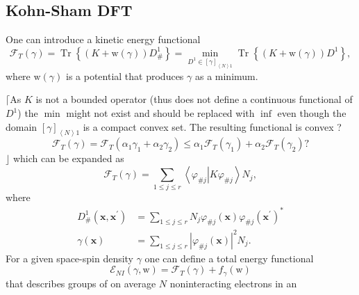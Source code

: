 \documentclass[aps,preprint]{revtex4}%
\begin{document}
\subsection{Kohn-Sham DFT}

\bigskip One can introduce a kinetic energy functional
\begin{equation}
\mathcal{F}_{T}\left(  \gamma\right)  =\operatorname{Tr}\left\{  \left(
K+\mathrm{w}\left(  \gamma\right)  \right)  D_{\#}^{1}\right\}  =\min
_{D^{1}\in\left[  \gamma\right]  _{\left\langle N\right\rangle 1}%
}\operatorname{Tr}\left\{  \left(  K+\mathrm{w}\left(  \gamma\right)  \right)
D^{1}\right\}  , \label{KEFunc}%
\end{equation}
where $\mathrm{w}\left(  \gamma\right)  $ is a potential that produces
$\gamma$ as a minimum.

$\lceil$As $K$ is not a bounded operator (thus does not define a continuous
functional of $D^{1}$) the $\min$ might not exist and should be replaced with
$\inf$ even though the domain $\left[  \gamma\right]  _{\left\langle
N\right\rangle 1}$ is a compact convex set. The resulting functional is convex
?
\begin{equation}
\mathcal{F}_{T}\left(  \gamma\right)  =\mathcal{F}_{T}\left(  \alpha_{1}%
\gamma_{1}+\alpha_{2}\gamma_{2}\right)  \leq\alpha_{1}\mathcal{F}_{T}\left(
\gamma_{1}\right)  +\alpha_{2}\mathcal{F}_{T}\left(  \gamma_{2}\right)  ?
\end{equation}
$\rfloor$ which can be expanded as
\begin{equation}
\mathcal{F}_{T}\left(  \gamma\right)  =\sum_{1\leq j\leq r}\left\langle
\varphi_{\#j}\left\vert K\varphi_{\#j}\right.  \right\rangle N_{j},
\end{equation}
where
\begin{align}
D_{\#}^{1}\left(  \mathbf{x,x}^{\prime}\right)   &  =\sum_{1\leq j\leq r}%
N_{j}\varphi_{\#j}\left(  \mathbf{x}\right)  \varphi_{\#j}\left(
\mathbf{x}^{\prime}\right)  ^{\ast}\nonumber\\
\gamma\left(  \mathbf{x}\right)   &  =\sum_{1\leq j\leq r}\left\vert
\varphi_{\#j}\left(  \mathbf{x}\right)  \right\vert ^{2}N_{j}. \label{gammaKS}%
\end{align}
For a given space-spin density $\gamma$ one can define a total energy
functional
\begin{equation}
\mathcal{E}_{NI}\left(  \gamma\mathbf{,}\mathrm{w}\right)  =\mathcal{F}%
_{T}\left(  \gamma\right)  +f_{\gamma}\left(  \mathrm{w}\right)
\end{equation}
that describes groups of on average $N$ noninteracting electrons in an
\end{document}
